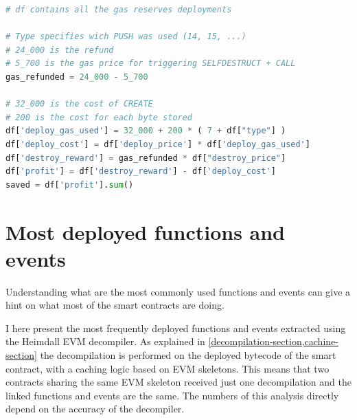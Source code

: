 \begin{lstlisting}[language=Python,label={lst:gas-calc},caption={Code for computing the total Eth saved with the GasToken pattern.},captionpos=b]
# df contains all the gas reserves deployments 

# Type specifies wich PUSH was used (14, 15, ...)
# 24_000 is the refund
# 5_700 is the gas price for triggering SELFDESTRUCT + CALL
gas_refunded = 24_000 - 5_700 

# 32_000 is the cost of CREATE
# 200 is the cost for each byte stored
df['deploy_gas_used'] = 32_000 + 200 * ( 7 + df["type"] )
df['deploy_cost'] = df['deploy_price'] * df['deploy_gas_used']
df['destroy_reward'] = gas_refunded * df["destroy_price"]
df['profit'] = df['destroy_reward'] - df['deploy_cost']
saved = df['profit'].sum()
\end{lstlisting}

\newpage


\newpage

\section{Most deployed functions and events}

Understanding what are the most commonly used functions and events can give a hint on what most of the smart contracts are doing.

I here present the most frequently deployed functions and events extracted using the Heimdall EVM decompiler. As explained in \cref{decompilation-section,cachine-section} the decompilation is performed on the deployed bytecode of the smart contract, with a caching logic based on EVM skeletons. This means that two contracts sharing the same EVM skeleton received just one decompilation and the linked functions and events are the same. The numbers of this analysis directly depend on the accuracy of the decompiler.

